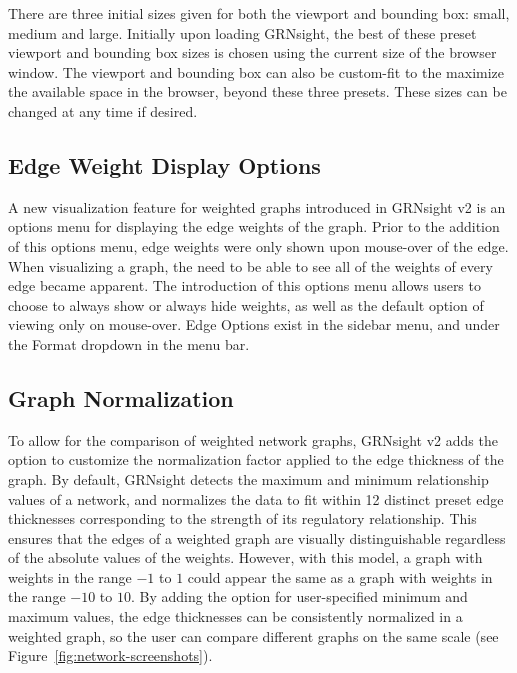 \documentclass[sigconf,review]{acmart}
\begin{document}
There are three initial sizes given for both the viewport and bounding box: small, medium and large. Initially upon loading GRNsight, the best of these preset viewport and bounding box sizes is chosen using the current size of the browser window. The viewport and bounding box can also be custom-fit to the maximize the available space in the browser, beyond these three presets. These sizes can be changed at any time if desired. 

\subsection{Edge Weight Display Options}
A new visualization feature for weighted graphs introduced in GRNsight v2 is an options menu for displaying the edge weights of the graph. Prior to the addition of this options menu, edge weights were only shown upon mouse-over of the edge. When visualizing a graph, the need to be able to see all of the weights of every edge became apparent. The introduction of this options menu allows users to choose to always show or always hide weights, as well as the default option of viewing only on mouse-over. Edge Options exist in the sidebar menu, and under the Format dropdown in the menu bar.

\subsection{Graph Normalization}

To allow for the comparison of weighted network graphs, GRNsight v2 adds the option to customize the normalization factor applied to the edge thickness of the graph. By default, GRNsight detects the maximum and minimum relationship values of a network, and normalizes the data to fit within 12 distinct preset edge thicknesses corresponding to the strength of its regulatory relationship. This ensures that the edges of a weighted graph are visually distinguishable regardless of the absolute values of the weights. However, with this model, a graph with weights in the range \(-1\) to \(1\) could appear the same as a graph with weights in the range \(-10\) to \(10\). By adding the option for user-specified minimum and maximum values, the edge thicknesses can be consistently normalized in a weighted graph, so the user can compare different graphs on the same scale (see Figure~\ref{fig:network-screenshots}).
\end{document}

